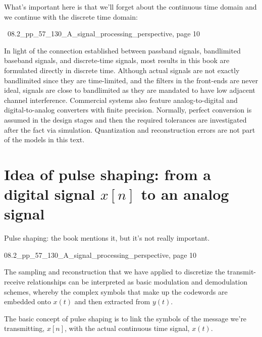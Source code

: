 \documentclass[a4paper, 12pt]{book}
\begin{document}
What's important here is that we'll forget about the continuous time domain and we continue with the discrete time domain:

\begin{tcolorbox}[colframe=yellow!80!orange, colback=white, boxrule=1pt, arc=2pt]
    \textcolor{green!60!black}{\small \ 08.2\_pp\_57\_130\_A\_signal\_processing\_perspective, page 10}

    In light of the connection established between passband signals, bandlimited baseband signals, and discrete-time signals, most results in this book are formulated directly in discrete time. Although actual signals are not exactly bandlimited since they are time-limited, and the filters in the front-ends are never ideal, signals are close to bandlimited as they are mandated to have low adjacent channel interference.
    Commercial systems also feature analog-to-digital and digital-to-analog converters with finite precision. Normally, perfect conversion is assumed in the design stages and then the required tolerances are investigated after the fact via simulation. Quantization and reconstruction errors are not part of the models in this text.
\end{tcolorbox}

\section[Pulse shaping: from digital signal to an analog]{Idea of pulse shaping: from a digital signal $x[n]$ to an analog signal}

Pulse shaping: the book mentions it, but it's not really important.

\begin{tcolorbox}[colframe=yellow!80!orange, colback=white, boxrule=1pt, arc=2pt]
    \textcolor{green!60!black}{\small 08.2\_pp\_57\_130\_A\_signal\_processing\_perspective, page 10}

    The sampling and reconstruction that we have applied to discretize the transmit-receive relationships can be interpreted as basic modulation and demodulation schemes, whereby the complex symbols that make up the codewords are embedded onto $x(t)$ and then extracted from $y(t)$.
\end{tcolorbox}

The basic concept of pulse shaping is to link the symbols of the message we're transmitting, $x[n]$, with the actual continuous time signal, $x(t)$.
\end{document}
